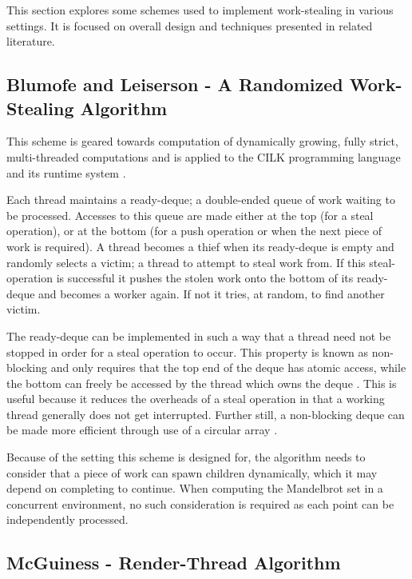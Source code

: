 This section explores some schemes used to implement work-stealing in various settings. It is focused on overall design and 
techniques presented in related literature. 

\subsection{Blumofe and Leiserson - A Randomized Work-Stealing Algorithm}
\label{sec:randscheme}

This scheme is geared towards computation of dynamically growing, fully strict, multi-threaded computations and is applied to the CILK
programming language and its runtime system \cite{blumleis}. 

Each thread maintains a \gls{ready-deque}; a double-ended queue of work waiting to be processed. 
Accesses to this queue are made either at the top (for a steal operation), or at the bottom (for a push operation
or when the next piece of work is required).
A thread becomes a \gls{thief} when its ready-deque is empty and randomly selects a \gls{victim}; a thread
to attempt to steal work from. If this \gls{steal-operation} is successful it pushes the stolen work 
onto the bottom of its ready-deque and becomes a worker again. If not it tries, at random, to find another victim.

The ready-deque can be implemented in such a way that a thread need not be stopped in order for a steal operation 
to occur. This property is known as \gls{non-blocking} and only requires that the top end of the deque has atomic access,
while the bottom can freely be accessed by the thread which owns the deque \cite{narora}. This is useful because it reduces the overheads 
of a steal operation in that a working thread generally does not get interrupted. 
Further still, a non-blocking deque can be made more efficient through use of a \gls{circular array} \cite{circdeque}.

Because of the setting this scheme is designed for, the algorithm needs to consider that
a piece of work can spawn children dynamically, which it may depend on completing to continue. 
When computing the Mandelbrot set in a concurrent environment, no such consideration is required 
as each point can be independently processed.

\subsection{McGuiness - Render-Thread Algorithm}
\label{sec:rendscheme}

